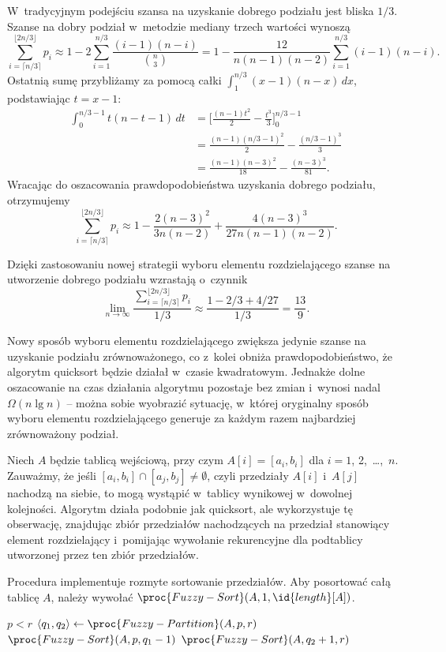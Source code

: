 \subproblem %
W~tradycyjnym podejściu szansa na uzyskanie dobrego podziału jest bliska $1/3$. Szanse na dobry podział w~metodzie mediany trzech wartości wynoszą
\[
	\sum_{i=\lceil n/3\rceil}^{\lfloor 2n/3\rfloor}p_i \approx 1-2\sum_{i=1}^{n/3}\frac{(i-1)(n-i)}{\binom{n}{3}} = 1-\frac{12}{n(n-1)(n-2)}\sum_{i=1}^{n/3}(i-1)(n-i).
\]
Ostatnią sumę przybliżamy za pomocą całki $\int_1^{n/3}(x-1)(n-x)\,dx$, podstawiając $t=x-1$:
\begin{align*}
    \int_0^{n/3-1}t(n-t-1)\,dt &= \biggl[\frac{(n-1)t^2}{2}-\frac{t^3}{3}\biggr]_0^{n/3-1} \\[1mm]
	&= \frac{(n-1)(n/3-1)^2}{2}-\frac{(n/3-1)^3}{3} \\[1mm]
	&= \frac{(n-1)(n-3)^2}{18}-\frac{(n-3)^3}{81}.
\end{align*}
Wracając do oszacowania prawdopodobieństwa uzyskania dobrego podziału, otrzymujemy
\[
    \sum_{i=\lceil n/3\rceil}^{\lfloor 2n/3\rfloor}p_i \approx 1-\frac{2(n-3)^2}{3n(n-2)}+\frac{4(n-3)^3}{27n(n-1)(n-2)}.
\]

Dzięki zastosowaniu nowej strategii wyboru elementu rozdzielającego szanse na utworzenie dobrego podziału wzrastają o~czynnik
\[
	\lim_{n\to\infty}\frac{\sum_{i=\lceil n/3\rceil}^{\lfloor 2n/3\rfloor}p_i}{1/3} \approx \frac{1-2/3+4/27}{1/3} = \frac{13}{9}.
\]

\subproblem %
Nowy sposób wyboru elementu rozdzielającego zwiększa jedynie szanse na uzyskanie podziału zrównoważonego, co z~kolei obniża prawdopodobieństwo, że algorytm quicksort będzie działał w~czasie kwadratowym. Jednakże dolne oszacowanie na czas działania algorytmu pozostaje bez zmian i~wynosi nadal $\Omega(n\lg n)$ -- można sobie wyobrazić sytuację, w~której oryginalny sposób wyboru elementu rozdzielającego generuje za każdym razem najbardziej zrównoważony podział.


\subproblem %
Niech $A$ będzie tablicą wejściową, przy czym $A[i]=[a_i,b_i]$ dla $i=1$, 2,~\dots,~$n$. Zauważmy, że jeśli $[a_i,b_i]\cap[a_j,b_j]\ne\emptyset$, czyli przedziały $A[i]$ i~$A[j]$ nachodzą na siebie, to mogą wystąpić w~tablicy wynikowej w~dowolnej kolejności. Algorytm działa podobnie jak quicksort, ale wykorzystuje tę obserwację, znajdując zbiór przedziałów nachodzących na przedział stanowiący element rozdzielający i~pomijając wywołanie rekurencyjne dla podtablicy utworzonej przez ten zbiór przedziałów.

Procedura  implementuje rozmyte sortowanie przedziałów. Aby posortować całą tablicę $A$, należy wywołać $\proc{Fuzzy-Sort}(A,1,\id{length}[A])$.
\begin{codebox}
\li	\If $p<r$
\li		\Then
			$\langle q_1,q_2\rangle\gets\proc{Fuzzy-Partition}(A,p,r)$
\li			$\proc{Fuzzy-Sort}(A,p,q_1-1)$ \label{li:fuzzy-sort-recursion1}
\li			$\proc{Fuzzy-Sort}(A,q_2+1,r)$ \label{li:fuzzy-sort-recursion2}
		\End
\end{codebox}

